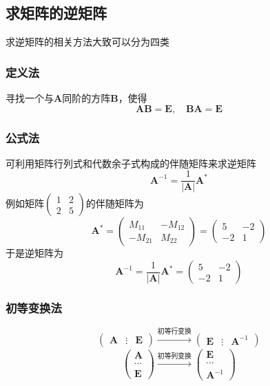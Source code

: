 \subsection{求矩阵的逆矩阵}
求逆矩阵的相关方法大致可以分为四类
\subsubsection{定义法} 寻找一个与$\boldsymbol{A}$同阶的方阵$\boldsymbol{B}$，使得
$$
    \boldsymbol{AB}=\boldsymbol{E}
    ,\quad
    \boldsymbol{BA}=\boldsymbol{E}
$$
\subsubsection{公式法}
可利用矩阵行列式和代数余子式构成的伴随矩阵来求逆矩阵
$$
    \boldsymbol{A}^{-1} = \frac{1}{|\boldsymbol{A}|}\boldsymbol{A}^*
$$
例如矩阵$\begin{pmatrix} 1 & 2 \\ 2 & 5 \end{pmatrix}$的伴随矩阵为
$$
    \boldsymbol{A}^* = \begin{pmatrix}
        M_{11}  & -M_{12} \\
        -M_{21} & M_{22}
    \end{pmatrix} = \begin{pmatrix}
        5  & -2 \\
        -2 & 1
    \end{pmatrix}
$$
于是逆矩阵为
$$
    \boldsymbol{A}^{-1}
    =\frac{1}{|\boldsymbol{A}|}\boldsymbol{A}^*
    =\begin{pmatrix}
        5  & -2 \\
        -2 & 1
    \end{pmatrix}
$$
\subsubsection{初等变换法}
$$
    \begin{pmatrix}
        \boldsymbol{A} & \vdots & \boldsymbol{E}
    \end{pmatrix}
    \xrightarrow[]{\text{初等行变换}}
    \begin{pmatrix}
        \boldsymbol{E} & \vdots & \boldsymbol{A}^{-1}
    \end{pmatrix}
$$
$$
    \begin{pmatrix}
        \boldsymbol{A} \\
        \cdots         \\
        \boldsymbol{E}
    \end{pmatrix}
    \xrightarrow[]{\text{初等列变换}}
    \begin{pmatrix}
        \boldsymbol{E} \\
        \cdots         \\
        \boldsymbol{A}^{-1}
    \end{pmatrix}
$$
